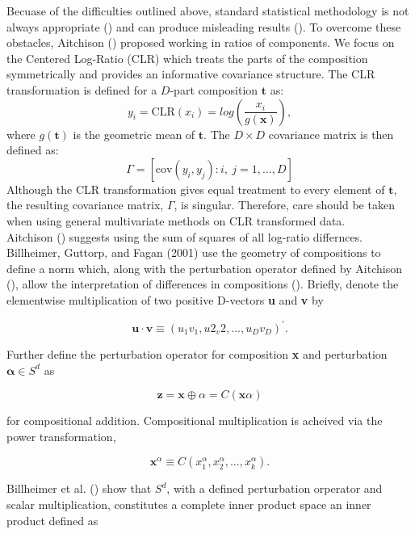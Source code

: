 \documentclass{article}\usepackage[]{graphicx}\usepackage[]{color}
\begin{document}
Becuase of the difficulties outlined above, standard statistical methodology is not always appropriate (\cite{Aitchison1986}) and can produce misleading results (\cite{Lovell2015}).  To overcome these obstacles, Aitchison (\cite{Aitchison1980}) proposed working in ratios of components. We focus on the Centered Log-Ratio (CLR) which treats the parts of the composition symmetrically and provides an informative covariance structure.  The CLR transformation is defined for a $D$-part composition $\mathbf{t}$ as:
\begin{equation}
y_i  = \text{CLR}(x_i) = log \left(\frac{x_i}{g(\mathbf{x})} \right),
\label{clr}
\end{equation}
where $g(\mathbf{t})$ is the geometric mean of $\mathbf{t}$.  The $D \times D$ covariance matrix is then defined as:
\begin{equation}
\Gamma = \left[\text{cov}\left(y_i, y_j \right): i,\ j = 1, ..., D \right]
\label{gamma}
\end{equation}
Although the CLR transformation gives equal treatment to every element of $\mathbf{t}$, the resulting covariance matrix, $\Gamma$, is singular.  Therefore, care should be taken when using general multivariate methods on CLR transformed data.\\



Aitchison (\cite{Aitchison1986, Aitchison1992}) suggests using the sum of squares of all log-ratio differnces.  Billheimer, Guttorp, and Fagan (2001) use the geometry of compositions to define a norm which, along with the perturbation operator defined by Aitchison (\cite{Aitchison1986}), allow the interpretation of differences in compositions (\cite{Billheimer2001}). Briefly, denote the elementwise multiplication of two positive D-vectors \textbf{u} and \textbf{v} by  

$$\mathbf{u}\cdot \mathbf{v} \equiv \left( u_1v_1, u2_v2, ..., u_Dv_D\right)^\prime.$$

Further define the perturbation operator for composition \textbf{x} and perturbation $\mathbf{\alpha} \in S^{d}$ as

$$\mathbf{z} = \mathbf{x}\oplus \alpha = C\left(\mathbf{x}\alpha \right)$$

for compositional addition.  Compositional multiplication is acheived via the power transformation, 

$$\mathbf{x}^\alpha \equiv C\left(x_1^\alpha, x_2^\alpha, ..., x_k^\alpha \right).$$

Billheimer et al. (\cite{Billheimer2001}) show that $S^d$, with a defined perturbation orperator and scalar multiplication, constitutes a complete inner product space an inner product defined as
\end{document}
